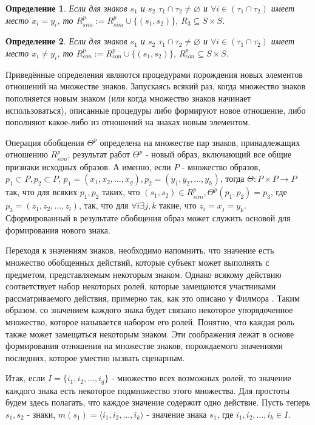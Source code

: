 \documentclass[12pt]{scrartcl}
\newtheorem{definition}{Определение}
\begin{document}
	\begin{definition}
		Если для знаков $s_1$ и $s_2$ $\tau_1\cap\tau_2\not =\varnothing$ и $\forall i\in(\tau_1\cap\tau_2)$ имеет место $x_i=y_i$, то $R^p_{sim}:=R^p_{sim}\cup\{(s_1,s_2)\}$, $R_3\subseteq S\times S$.
	\end{definition}
	
	\begin{definition}
		Если для знаков $s_1$ и $s_2$ $\tau_1\cap\tau_2\not =\varnothing$ и $\forall i\in(\tau_1\cap\tau_2)$ имеет место $x_i\not =y_i$, то $R^p_{con}:=R^p_{con}\cup\{(s_1,s_2)\}$, $R^p_{con}\subseteq S\times S$.
	\end{definition}

	Приведённые определения являются процедурами порождения новых элементов отношений на множестве знаков. Запускаясь всякий раз, когда множество знаков пополняется новым знаком (или когда множество знаков начинает использоваться), описанные процедуры либо формируют новое отношение, либо пополняют какое-либо из отношений на знаках новым элементом.
	
	Операция обобщения $\Theta^p$ определена на множестве пар знаков, принадлежащих отношению $R^p_{sim}$; результат работ $\Theta^p$ - новый образ, включающий все общие признаки исходных образов. А именно, если $P$ - множество образов, $p_1\subset P,p_2\subset P$, $p_1=(x_1,x_2,\dots,x_g), p_2=(y_1,y_2,\dots,y_h)$, тогда $\Theta:P\times P\rightarrow P$ так, что для всяких $p_1,p_2$ таких, что $(s_1,s_2)\in R^p_{sim}, \Theta^p(p_1,p_2)=p_3$, где $p_3=(z_1,z_2,\dots, z_l)$, так, что для $\forall i\exists j,k$ такие, что $z_i=x_j=y_k$. Сформированный в результате обобщения образ может служить основой для формирования нового знака.
	
	Переходя к значениям знаков, необходимо напомнить, что значение есть множество обобщенных действий, которые субъект может выполнять с предметом, представляемым некоторым знаком. Однако всякому действию соответствует набор некоторых ролей, которые замещаются участниками рассматриваемого действия, примерно так, как это описано у Филмора \cite{Fillmore1988}. Таким образом, со значением каждого знака будет связано некоторое упорядоченное множество, которое называется набором его ролей. Понятно, что каждая роль также может замещаться некоторым знаком. Эти соображения лежат в основе формирования отношения на множестве знаков, порождаемого значениями последних, которое уместно назвать сценарным. 
	
	Итак, если $I=\{i_1,i_2,\dots,i_q\}$ - множество всех возможных	ролей, то значение каждого знака есть некоторое подмножество этого множества. Для простоты будем здесь полагать, что каждое значение содержит одно действие. Пусть теперь $s_1, s_2$ - знаки, $m(s_1)=\langle i_1,i_2,\dots,i_k \rangle$ - значение знака $s_1$, где $i_1,i_2,\dots,i_k\in I$.
	
\end{document}
